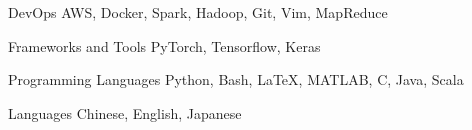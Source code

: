 

\begin{cvskills}

  \cvskill
    {DevOps} %
    {AWS, Docker, Spark, Hadoop, Git, Vim, MapReduce} %



  \cvskill
    {Frameworks and Tools} %
    {PyTorch, Tensorflow, Keras} %
    
  \cvskill
    {Programming Languages} %
    {Python, Bash, LaTeX, MATLAB, C, Java, Scala} %

 \cvskill
   {Languages} %
  {Chinese, English, Japanese} %

\end{cvskills}
